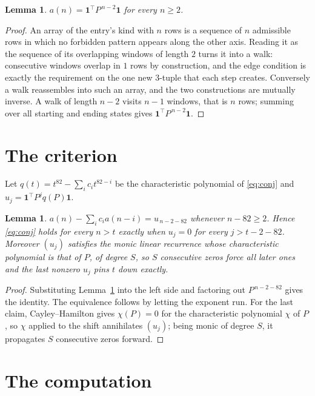 \documentclass[11pt,a4paper]{article}
\theoremstyle{plain}
\newtheorem{lemma}[theorem]{Lemma}
\theoremstyle{definition}
\begin{document}
\begin{lemma}\label{lem:walk}
$a(n)=\mathbf{1}^{\!\top}P^{\,n-2}\mathbf{1}$ for every $n\ge2$.
\end{lemma}

\begin{proof}
An array of the entry's kind with $n$ rows is a sequence of $n$ admissible rows in
which no forbidden pattern appears along the other axis. Reading it as the sequence of its
overlapping windows of length $2$ turns it into a walk: consecutive windows overlap in
$1$ rows by construction, and the edge condition is exactly the requirement on the one
new $3$-tuple that each step creates. Conversely a walk reassembles into such an array,
and the two constructions are mutually inverse. A walk of length $n-2$ visits $n-1$
windows, that is $n$ rows; summing over all starting and ending states gives
$\mathbf{1}^{\!\top}P^{\,n-2}\mathbf{1}$.
\end{proof}

\section{The criterion}

Let $q(t)=t^{82}-\sum_i c_i t^{82-i}$ be the characteristic polynomial of
\eqref{eq:conj} and $u_j=\mathbf{1}^{\!\top}P^{j}q(P)\mathbf{1}$.

\begin{lemma}\label{lem:crit}
$a(n)-\sum_i c_i a(n-i)=u_{\,n-2-82}$ whenever $n-82\ge2$. Hence
\eqref{eq:conj} holds for every $n>t$ exactly when $u_j=0$ for every
$j>t-2-82$. Moreover $(u_j)$ satisfies the monic linear recurrence whose
characteristic polynomial is that of $P$, of degree $S$, so $S$ consecutive zeros force all
later ones and the last nonzero $u_j$ pins $t$ down exactly.
\end{lemma}

\begin{proof}
Substituting Lemma~\ref{lem:walk} into the left side and factoring out
$P^{\,n-2-82}$ gives the identity. The equivalence follows by letting the exponent
run. For the last claim, Cayley--Hamilton gives $\chi(P)=0$ for the characteristic
polynomial $\chi$ of $P$, so $\chi$ applied to the shift annihilates $(u_j)$; being monic of
degree $S$, it propagates $S$ consecutive zeros forward.
\end{proof}

\section{The computation}
\end{document}
